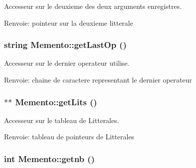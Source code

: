 Accesseur sur le deuxieme des deux arguments enregistres. 

\begin{Desc}
\item[Renvoie:]pointeur sur la deuxieme litterale \end{Desc}
\hypertarget{class_memento_e0caadaf7cabf3c5904cd8416718c2bb}{
\subsubsection[{getLastOp}]{\setlength{\rightskip}{0pt plus 5cm}string Memento::getLastOp ()}}
\label{class_memento_e0caadaf7cabf3c5904cd8416718c2bb}


Accesseur sur le dernier operateur utilise. 

\begin{Desc}
\item[Renvoie:]chaine de caractere representant le dernier operateur \end{Desc}
\hypertarget{class_memento_8d8c047f861706c999f8115fa16fd58f}{
\subsubsection[{getLits}]{$\ast$$\ast$ Memento::getLits ()}}
\label{class_memento_8d8c047f861706c999f8115fa16fd58f}


Accesseur sur le tableau de Litterales. 

\begin{Desc}
\item[Renvoie:]tableau de pointeurs de Litterales \end{Desc}
\hypertarget{class_memento_e45233d8532ac8fbc47ed8b1e5f091f5}{
\subsubsection[{getnb}]{\setlength{\rightskip}{0pt plus 5cm}int Memento::getnb ()}}
\label{class_memento_e45233d8532ac8fbc47ed8b1e5f091f5}


